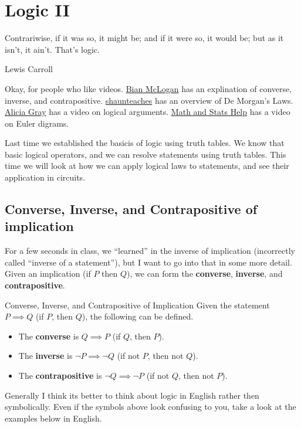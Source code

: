 \chapter{Logic II}

\epigraph{Contrariwise, if it was so, it might be; and if it were so, it would be; but as it isn't, it ain't. That's logic.}{Lewis Carroll}

Okay, for people who like videos. \href{https://www.youtube.com/watch?v=cDRqud3q3Fg}{Bian McLogan} has an explination of converse, inverse, and contrapositive. \href{https://www.youtube.com/watch?v=tKnS3s8fOu4}{shaunteaches} has an overview of De Morgan's Laws. \href{https://www.youtube.com/watch?v=YBNrkXEqCiI}{Alicia Gray} has a video on logical arguments. \href{https://www.youtube.com/watch?v=N6_Q1kcXiIg}{Math and Stats Help} has a video on Euler digrams.

Last time we established the basicis of logic using truth tables. We know that basic logical operators, and we can resolve statements using truth tables. This time we will look at how we can apply logical laws to statements, and see their application in circuits.

\section{Converse, Inverse, and Contrapositive of implication}

For a few seconds in class, we ``learned'' in the inverse of implication (incorrectly called ``inverse of a statement''), but I want to go into that in some more detail. Given an implication (if $P$ then $Q$), we can form the {\bf converse}, {\bf inverse}, and {\bf contrapositive}.

\begin{boxdefine}{Converse, Inverse, and Contrapositive of Implication}{}
	Given the statement $P \implies Q$ (if $P$, then $Q$), the following can be defined.
	\begin{itemize}
		\item The {\bf converse} is $Q \implies P$ (if $Q$, then $P$).
		\item The {\bf inverse} is $\lnot P \implies \lnot Q$ (if not $P$, then not $Q$).
		\item The {\bf contrapositive} is $\lnot Q \implies \lnot P$ (if not $Q$, then not $P$).
	\end{itemize}
\end{boxdefine}

Generally I think its better to think about logic in English rather then symbolically. Even if the symbols above look confusing to you, take a look at the examples below in English.

